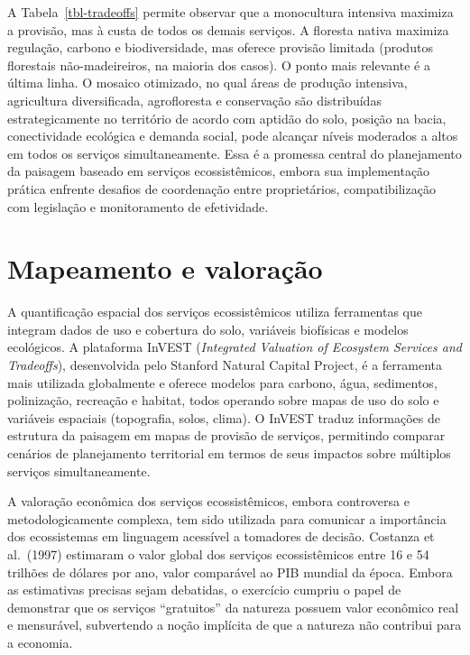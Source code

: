 \documentclass[
  portuguese,
  11pt,
  a4paper,
  open=any]{scrbook}
\begin{document}
A Tabela~\ref{tbl-tradeoffs} permite observar que a monocultura
intensiva maximiza a provisão, mas à custa de todos os demais serviços.
A floresta nativa maximiza regulação, carbono e biodiversidade, mas
oferece provisão limitada (produtos florestais não-madeireiros, na
maioria dos casos). O ponto mais relevante é a última linha. O mosaico
otimizado, no qual áreas de produção intensiva, agricultura
diversificada, agrofloresta e conservação são distribuídas
estrategicamente no território de acordo com aptidão do solo, posição na
bacia, conectividade ecológica e demanda social, pode alcançar níveis
moderados a altos em todos os serviços simultaneamente. Essa é a
promessa central do planejamento da paisagem baseado em serviços
ecossistêmicos, embora sua implementação prática enfrente desafios de
coordenação entre proprietários, compatibilização com legislação e
monitoramento de efetividade.

\section{Mapeamento e valoração}\label{mapeamento-e-valorauxe7uxe3o}

A quantificação espacial dos serviços ecossistêmicos utiliza ferramentas
que integram dados de uso e cobertura do solo, variáveis biofísicas e
modelos ecológicos. A plataforma InVEST (\emph{Integrated Valuation of
Ecosystem Services and Tradeoffs}), desenvolvida pelo Stanford Natural
Capital Project, é a ferramenta mais utilizada globalmente e oferece
modelos para carbono, água, sedimentos, polinização, recreação e
habitat, todos operando sobre mapas de uso do solo e variáveis espaciais
(topografia, solos, clima). O InVEST traduz informações de estrutura da
paisagem em mapas de provisão de serviços, permitindo comparar cenários
de planejamento territorial em termos de seus impactos sobre múltiplos
serviços simultaneamente.

A valoração econômica dos serviços ecossistêmicos, embora controversa e
metodologicamente complexa, tem sido utilizada para comunicar a
importância dos ecossistemas em linguagem acessível a tomadores de
decisão. Costanza et al.~(1997) estimaram o valor global dos serviços
ecossistêmicos entre 16 e 54 trilhões de dólares por ano, valor
comparável ao PIB mundial da época. Embora as estimativas precisas sejam
debatidas, o exercício cumpriu o papel de demonstrar que os serviços
``gratuitos'' da natureza possuem valor econômico real e mensurável,
subvertendo a noção implícita de que a natureza não contribui para a
economia.
\end{document}
